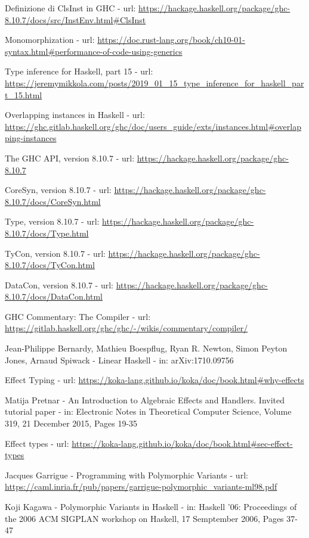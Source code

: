\documentclass[10pt,a4paper]{article}
\begin{document}
\begin{enumerate}[label={[\arabic*]}]
    \item Definizione di ClsInst in GHC - url: \url{https://hackage.haskell.org/package/ghc-8.10.7/docs/src/InstEnv.html#ClsInst}
    \item Monomorphization - url: \url{https://doc.rust-lang.org/book/ch10-01-syntax.html#performance-of-code-using-generics}
    \item Type inference for Haskell, part 15 - url: \url{https://jeremymikkola.com/posts/2019_01_15_type_inference_for_haskell_part_15.html}
    \item Overlapping instances in Haskell - url: \url{https://ghc.gitlab.haskell.org/ghc/doc/users_guide/exts/instances.html#overlapping-instances}
    \item The GHC API, version 8.10.7 - url: \url{https://hackage.haskell.org/package/ghc-8.10.7}
    \item CoreSyn, version 8.10.7 - url: \url{https://hackage.haskell.org/package/ghc-8.10.7/docs/CoreSyn.html}
    \item Type, version 8.10.7 - url: \url{https://hackage.haskell.org/package/ghc-8.10.7/docs/Type.html}
    \item TyCon, version 8.10.7 - url: \url{https://hackage.haskell.org/package/ghc-8.10.7/docs/TyCon.html}
    \item DataCon, version 8.10.7 - url: \url{https://hackage.haskell.org/package/ghc-8.10.7/docs/DataCon.html}
    \item GHC Commentary: The Compiler - url: \url{https://gitlab.haskell.org/ghc/ghc/-/wikis/commentary/compiler/}
    \item Jean-Philippe Bernardy, Mathieu Boespflug, Ryan R. Newton, Simon Peyton Jones, Arnaud Spiwack - Linear Haskell -
    in: arXiv:1710.09756
    \item Effect Typing - url: \url{https://koka-lang.github.io/koka/doc/book.html#why-effects}
    \item Matija Pretnar - An Introduction to Algebraic Effects and Handlers. Invited tutorial paper - in: Electronic
    Notes in Theoretical Computer Science, Volume 319, 21 December 2015, Pages 19-35
    \item Effect types - url: \url{https://koka-lang.github.io/koka/doc/book.html#sec-effect-types}
    \item Jacques Garrigue - Programming with Polymorphic Variants - url:
    \url{https://caml.inria.fr/pub/papers/garrigue-polymorphic_variants-ml98.pdf}
    \item Koji Kagawa - Polymorphic Variants in Haskell - in: Haskell '06: Proceedings of the 2006 ACM SIGPLAN workshop
    on Haskell, 17 Semptember 2006, Pages 37-47
\end{enumerate}
\end{document}
